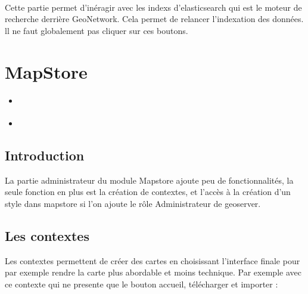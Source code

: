 \documentclass[letterpaper,10pt,french]{sphinxmanual}
\begin{document}
\sphinxAtStartPar
 

\sphinxAtStartPar
Cette partie permet d’inéragir avec les indexs d’elasticsearch qui est le moteur de recherche derrière GeoNetwork. Cela permet de relancer l’indexation
des données. ll ne faut globalement pas cliquer sur ces boutons.

\sphinxstepscope


\section{MapStore}
\label{\detokenize{doc_admin/visualiseur:mapstore}}\label{\detokenize{doc_admin/visualiseur::doc}}
\begin{sphinxShadowBox}
\begin{itemize}
\item {} 
\sphinxAtStartPar
{}\label{\detokenize{doc_admin/visualiseur:id1}}{\hyperref[\detokenize{doc_admin/visualiseur:introduction}]{}}

\item {} 
\sphinxAtStartPar
{}\label{\detokenize{doc_admin/visualiseur:id2}}{\hyperref[\detokenize{doc_admin/visualiseur:les-contextes}]{}}

\end{itemize}
\end{sphinxShadowBox}


\subsection{Introduction}
\label{\detokenize{doc_admin/visualiseur:introduction}}
\sphinxAtStartPar
La partie administrateur du module Mapstore ajoute peu de fonctionnalités, la seule fonction en plus est la création de contextes, et l’accès à la création d’un style
dans mapstore si l’on ajoute le rôle Administrateur de geoserver.


\subsection{Les contextes}
\label{\detokenize{doc_admin/visualiseur:les-contextes}}
\sphinxAtStartPar
Les contextes permettent de créer des cartes en choisissant l’interface finale pour par exemple rendre la carte plus abordable et moins technique.
Par exemple avec ce contexte qui ne presente que le bouton accueil, télécharger et importer :
\end{document}
